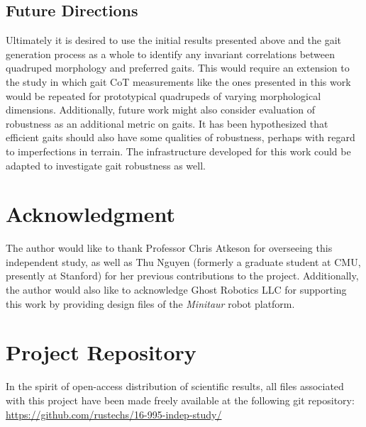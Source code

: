 \documentclass[conference,11pt,letterpaper]{IEEEtran}
\begin{document}
\subsection{Future Directions}
Ultimately it is desired to use the initial results presented above and the gait generation process as a whole to identify any invariant correlations between quadruped morphology and preferred gaits. This would require an extension to the study in which gait CoT measurements like the ones presented in this work would be repeated for prototypical quadrupeds of varying morphological dimensions. Additionally, future work might also consider evaluation of robustness as an additional metric on gaits. It has been hypothesized that efficient gaits should also have some qualities of robustness, perhaps with regard to imperfections in terrain. The infrastructure developed for this work could be adapted to investigate gait robustness as well.

\section*{Acknowledgment}

The author would like to thank Professor Chris Atkeson for overseeing this independent study, as well as Thu Nguyen (formerly a graduate student at CMU, presently at Stanford) for her previous contributions to the project. Additionally, the author would also like to acknowledge Ghost Robotics LLC for supporting this work by providing design files of the \emph{Minitaur} robot platform. 

\appendix
\section{Project Repository}
In the spirit of open-access distribution of scientific results, all files associated with this project have been made freely available at the following git repository: \url{https://github.com/rustechs/16-995-indep-study/}

\nocite{*}
\printbibliography

\end{document}
